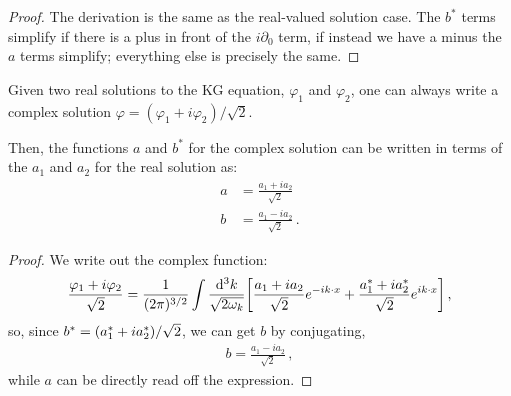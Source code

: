 \documentclass[main.tex]{subfiles}
\begin{document}
\begin{proof}
The derivation is the same as the real-valued solution case. The \(b^{*}\) terms simplify if there is a plus in front of the \(i \partial_{0}\) term, if instead we have a minus the \(a\) terms simplify; everything else is precisely the same.  
\end{proof}

\begin{claim}
Given two real solutions to the KG equation, \(\varphi_{1}\) and \(\varphi_{2}\), one can always write a complex solution \(\varphi = (\varphi_{1} + i \varphi_{2}) / \sqrt{2}\). 

Then, the functions \(a\) and \(b^{*}\) for the complex solution can be written in terms of the \(a_{1}\) and \(a_2 \) for the real solution as: 
%
\begin{subequations}
\begin{align}
a &=  \frac{ a_1 + i a_2 }{\sqrt{2}} \\
b &= \frac{a_1 - i a_2 }{\sqrt{2}}
\,.
\end{align}
\end{subequations}
\end{claim}

\begin{proof}
We write out the complex function: 
%
\begin{align}
\frac{\varphi_1 + i \varphi_2 }{\sqrt{2}} = 
\frac{1}{(2 \pi )^{3/2}} 
\int \frac{ \dd[3]{k}}{\sqrt{2 \omega_{k }}} \qty[
\frac{a_1 + i a_2 }{\sqrt{2}} e^{-i k \cdot x}
+  \frac{a_1^{*} + i a_2^{*}}{\sqrt{2}}
e^{i k \cdot x}]
\,,
\end{align}
%
so, since \(b^{*} = \qty(a_1^{*} + i a_2^{*}) / \sqrt{2}\), we can get \(b\) by conjugating, 
%
\begin{align}
b = \frac{a_1 - i a_2 }{\sqrt{2}}
\,,
\end{align}
%
while \(a\) can be directly read off the expression.
\end{proof}
\end{document}
